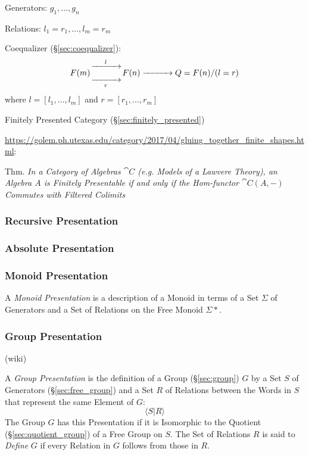 Generators: $g_1, \ldots, g_n$

Relations: $l_1 = r_1, \ldots, l_m = r_m$

Coequalizer (\S\ref{sec:coequalizer}):
\[
  F(m) {\xrightarrow[\quad\quad\quad]{l}
    \atop \xrightarrow[r]{\quad\quad\quad}} F(n)
  \xrightarrow{\quad\quad\quad} Q = F(n) / (l = r)
\]
where $l = [l_1, \ldots, l_m]$ and $r = [r_1, \ldots, r_m]$

Finitely Presented Category (\S\ref{sec:finitely_presented})

\url{https://golem.ph.utexas.edu/category/2017/04/gluing_together_finite_shapes.html}:

Thm. \emph{In a Category of Algebras $\cat{C}$ (e.g. Models of a
  Lawvere Theory), an Algebra $A$ is Finitely Presentable if and only
  if the Hom-functor $\cat{C}(A,-)$ Commutes with Filtered Colimits}



\subsubsection{Recursive Presentation}\label{sec:recursive_presentation}

\subsubsection{Absolute Presentation}\label{sec:absolute_presentation}

\subsubsection{Monoid Presentation}\label{sec:monoid_presentation}

A \emph{Monoid Presentation} is a description of a Monoid in terms of a Set
$\Sigma$ of Generators and a Set of Relations on the Free Monoid $\Sigma*$.



\subsubsection{Group Presentation}\label{sec:group_presentation}

(wiki)

A \emph{Group Presentation} is the definition of a Group (\S\ref{sec:group}) $G$
by a Set $S$ of Generators (\S\ref{sec:free_group}) and a Set $R$ of Relations
between the Words in $S$ that represent the same Element of $G$:
\[
  \langle S | R \rangle
\]
The Group $G$ has this Presentation if it is Isomorphic to the Quotient
(\S\ref{sec:quotient_group}) of a Free Group on $S$. The Set of Relations $R$ is
said to \emph{Define} $G$ if every Relation in $G$ follows from those in $R$.

